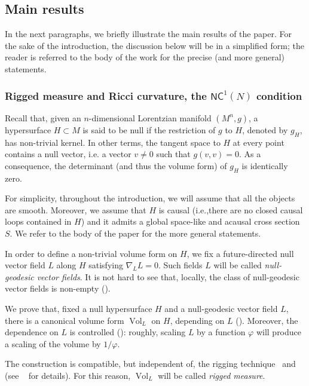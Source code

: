 \documentclass[12pt,a4paper]{amsart}
\theoremstyle{plain}
\theoremstyle{definition}
\numberwithin{equation}{section}
\DeclareMathOperator{\vol}{Vol}
\newcommand{\NC}{\mathsf{NC}}
\begin{document}
\subsection*{Main results} In the next paragraphs, we briefly illustrate the main results of the paper. For the sake of the introduction, the discussion below will be in a simplified form; the reader is referred to the body of the work for the precise (and more general) statements.

\subsubsection*{\textbf{Rigged measure and Ricci curvature, the $\NC^1(N)$ condition}}
 

Recall that, given an $n$-dimensional Lorentzian manifold $(M^{n}, g)$, a hypersurface $H\subset M$ is said to be null if the restriction of $g$ to $H$, denoted by $g_H$, has non-trivial kernel. In other terms, the tangent space to $H$ at every point contains a null vector, i.e. a vector $v\neq 0$ such that $g(v,v)=0$. As a consequence, the determinant (and thus the volume form) of $g_H$ is identically zero.

\smallskip
For simplicity, throughout the introduction, we will assume that all the objects are smooth. Moreover, we assume that $H$ is causal (i.e.,there are no closed causal loops contained in $H$) and it admits a global space-like and acausal cross section $S$. We refer to the body of the paper for the more general statements.
\smallskip

In order to define a non-trivial volume form on $H$, we fix a  future-directed null vector field $L$ along $H$ satisfying $\nabla_L L=0$. Such fields $L$ will be called \emph{null-geodesic vector fields}. It is not hard to see that, locally, the class of null-geodesic vector fields is non-empty ().

We prove that, fixed a null hypersurface $H$ and a null-geodesic vector field $L$, there is a canonical volume form $\vol_L$ on $H$, depending on $L$ (). Moreover, the dependence on $L$ is controlled (): roughly, scaling $L$ by a function $\varphi$ will produce a scaling of the volume by $1/\varphi$. 

The construction is compatible, but independent of, the rigging technique~\cite{Rigging} and~\cite[Sect.~2.6]{MinguzziCMP15} (see ~ for details). For this reason, $\vol_L$ will be called \emph{rigged measure}.
\end{document}
